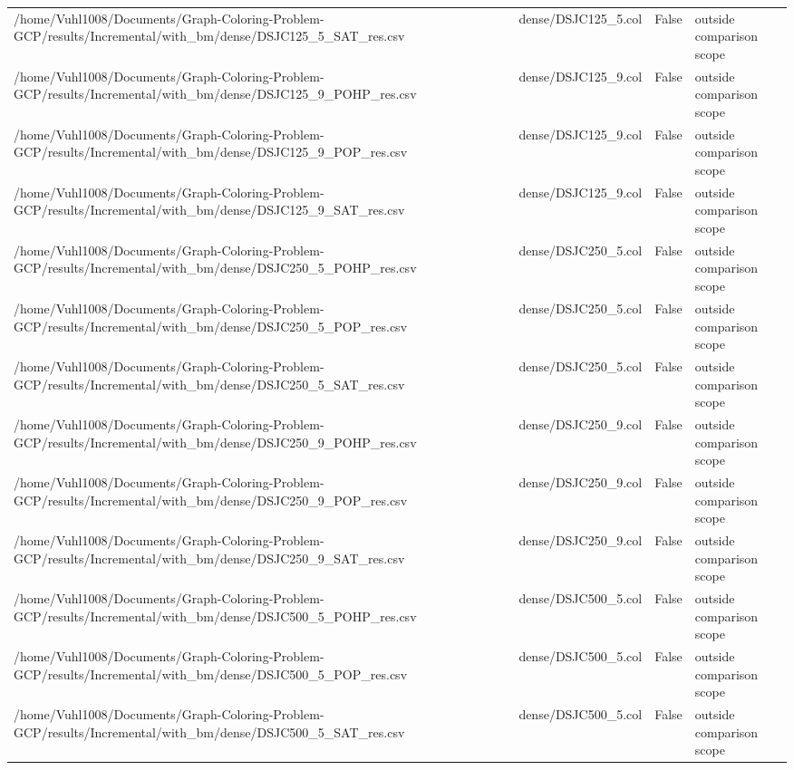 \begin{table}[htbp]
\begin{tabular}{llll}
/home/Vuhl1008/Documents/Graph-Coloring-Problem-GCP/results/Incremental/with\_bm/dense/DSJC125\_5\_SAT\_res.csv & dense/DSJC125\_5.col & False & outside comparison scope \\
/home/Vuhl1008/Documents/Graph-Coloring-Problem-GCP/results/Incremental/with\_bm/dense/DSJC125\_9\_POHP\_res.csv & dense/DSJC125\_9.col & False & outside comparison scope \\
/home/Vuhl1008/Documents/Graph-Coloring-Problem-GCP/results/Incremental/with\_bm/dense/DSJC125\_9\_POP\_res.csv & dense/DSJC125\_9.col & False & outside comparison scope \\
/home/Vuhl1008/Documents/Graph-Coloring-Problem-GCP/results/Incremental/with\_bm/dense/DSJC125\_9\_SAT\_res.csv & dense/DSJC125\_9.col & False & outside comparison scope \\
/home/Vuhl1008/Documents/Graph-Coloring-Problem-GCP/results/Incremental/with\_bm/dense/DSJC250\_5\_POHP\_res.csv & dense/DSJC250\_5.col & False & outside comparison scope \\
/home/Vuhl1008/Documents/Graph-Coloring-Problem-GCP/results/Incremental/with\_bm/dense/DSJC250\_5\_POP\_res.csv & dense/DSJC250\_5.col & False & outside comparison scope \\
/home/Vuhl1008/Documents/Graph-Coloring-Problem-GCP/results/Incremental/with\_bm/dense/DSJC250\_5\_SAT\_res.csv & dense/DSJC250\_5.col & False & outside comparison scope \\
/home/Vuhl1008/Documents/Graph-Coloring-Problem-GCP/results/Incremental/with\_bm/dense/DSJC250\_9\_POHP\_res.csv & dense/DSJC250\_9.col & False & outside comparison scope \\
/home/Vuhl1008/Documents/Graph-Coloring-Problem-GCP/results/Incremental/with\_bm/dense/DSJC250\_9\_POP\_res.csv & dense/DSJC250\_9.col & False & outside comparison scope \\
/home/Vuhl1008/Documents/Graph-Coloring-Problem-GCP/results/Incremental/with\_bm/dense/DSJC250\_9\_SAT\_res.csv & dense/DSJC250\_9.col & False & outside comparison scope \\
/home/Vuhl1008/Documents/Graph-Coloring-Problem-GCP/results/Incremental/with\_bm/dense/DSJC500\_5\_POHP\_res.csv & dense/DSJC500\_5.col & False & outside comparison scope \\
/home/Vuhl1008/Documents/Graph-Coloring-Problem-GCP/results/Incremental/with\_bm/dense/DSJC500\_5\_POP\_res.csv & dense/DSJC500\_5.col & False & outside comparison scope \\
/home/Vuhl1008/Documents/Graph-Coloring-Problem-GCP/results/Incremental/with\_bm/dense/DSJC500\_5\_SAT\_res.csv & dense/DSJC500\_5.col & False & outside comparison scope \\

\end{tabular}
\end{table}
